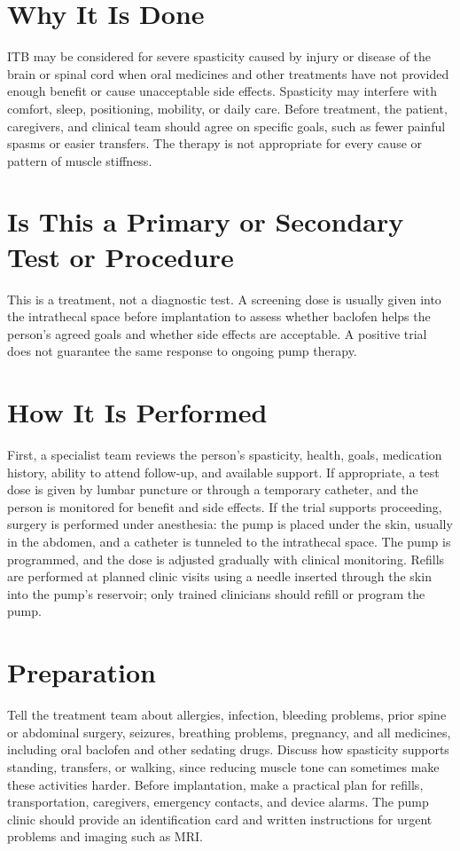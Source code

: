 \section*{Why It Is Done}
ITB may be considered for severe spasticity caused by injury or disease of the brain or spinal cord when oral medicines and other treatments have not provided enough benefit or cause unacceptable side effects. Spasticity may interfere with comfort, sleep, positioning, mobility, or daily care. Before treatment, the patient, caregivers, and clinical team should agree on specific goals, such as fewer painful spasms or easier transfers. The therapy is not appropriate for every cause or pattern of muscle stiffness.

\section*{Is This a Primary or Secondary Test or Procedure}
This is a treatment, not a diagnostic test. A screening dose is usually given into the intrathecal space before implantation to assess whether baclofen helps the person's agreed goals and whether side effects are acceptable. A positive trial does not guarantee the same response to ongoing pump therapy.

\section*{How It Is Performed}
First, a specialist team reviews the person's spasticity, health, goals, medication history, ability to attend follow-up, and available support. If appropriate, a test dose is given by lumbar puncture or through a temporary catheter, and the person is monitored for benefit and side effects. If the trial supports proceeding, surgery is performed under anesthesia: the pump is placed under the skin, usually in the abdomen, and a catheter is tunneled to the intrathecal space. The pump is programmed, and the dose is adjusted gradually with clinical monitoring. Refills are performed at planned clinic visits using a needle inserted through the skin into the pump's reservoir; only trained clinicians should refill or program the pump.

\section*{Preparation}
Tell the treatment team about allergies, infection, bleeding problems, prior spine or abdominal surgery, seizures, breathing problems, pregnancy, and all medicines, including oral baclofen and other sedating drugs. Discuss how spasticity supports standing, transfers, or walking, since reducing muscle tone can sometimes make these activities harder. Before implantation, make a practical plan for refills, transportation, caregivers, emergency contacts, and device alarms. The pump clinic should provide an identification card and written instructions for urgent problems and imaging such as MRI.

